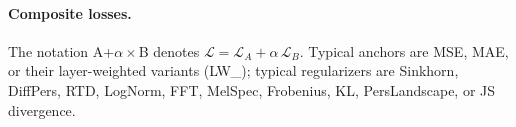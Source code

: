 \documentclass{article}
\begin{document}
\paragraph{Composite losses.}
The notation A+$\alpha\times$B denotes
$\mathcal{L} = \mathcal{L}_A + \alpha\,\mathcal{L}_B$.
Typical anchors are MSE, MAE, or their layer-weighted variants (LW\_);
typical regularizers are Sinkhorn, DiffPers, RTD, LogNorm, FFT,
MelSpec, Frobenius, KL, PersLandscape, or JS divergence.

\newpage

\end{document}
